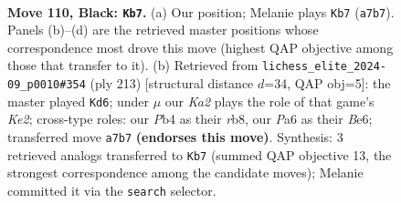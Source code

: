 \documentclass[11pt]{article}
\begin{document}
\begin{figure}[p]\centering
\begin{subfigure}{0.46\textwidth}\centering
\resizebox{\linewidth}{!}{%
\newchessgame
\chessboard[
  setfen={8/k7/p5r1/P1p2p1p/1p3P1P/1P2PKP1/7R/8 b - - 8 110},
  showmover=false,
  pgfstyle=straightmove, color=movearrow, markmove={a7-b7}
]}
\caption{}
\end{subfigure}\hfill
\begin{subfigure}{0.46\textwidth}\centering
\resizebox{\linewidth}{!}{%
\newchessgame
\chessboard[
  setfen={1R6/4k3/4b1p1/2p4p/p1r4P/P1B2PK1/1P4P1/8 b - - 35 107},
  showmover=false,
  pgfstyle=straightmove, color=movearrow, markmove={e7-d6}
]}
\caption{}
\end{subfigure}
\\[4pt]

\caption{\textbf{Move 110, Black: \texttt{Kb7}.} (a) Our position; Melanie plays \texttt{Kb7} (\texttt{a7b7}). Panels (b)--(d) are the retrieved master positions whose correspondence most drove this move (highest QAP objective among those that transfer to it). (b) Retrieved from \texttt{lichess\_elite\_2024-09\_p0010\#354} (ply 213) [structural distance $d$=34, QAP obj=5]: the master played \texttt{Kd6}; under $\mu$ our \emph{Ka2} plays the role of that game's \emph{Ke2}; cross-type roles: our \emph{P}b4 as their \emph{r}b8, our \emph{P}a6 as their \emph{B}e6; transferred move \texttt{a7b7} \textbf{(endorses this move)}. Synthesis: 3 retrieved analogs transferred to \texttt{Kb7} (summed QAP objective 13, the strongest correspondence among the candidate moves); Melanie committed it via the \texttt{search} selector.}
\label{fig:thought-m219}
\end{figure}

\clearpage
\end{document}
